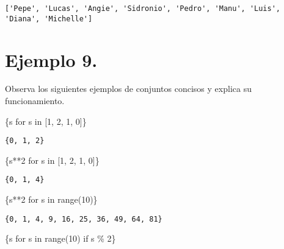 \documentclass[
  letterpaper,
  DIV=11,
  numbers=noendperiod]{scrreprt}
\newenvironment{Shaded}{\begin{snugshade}}{\end{snugshade}}
\newcommand{\BuiltInTok}[1]{\textcolor[rgb]{0.00,0.23,0.31}{#1}}
\newcommand{\ControlFlowTok}[1]{\textcolor[rgb]{0.00,0.23,0.31}{#1}}
\newcommand{\DecValTok}[1]{\textcolor[rgb]{0.68,0.00,0.00}{#1}}
\newcommand{\KeywordTok}[1]{\textcolor[rgb]{0.00,0.23,0.31}{#1}}
\newcommand{\NormalTok}[1]{\textcolor[rgb]{0.00,0.23,0.31}{#1}}
\newcommand{\OperatorTok}[1]{\textcolor[rgb]{0.37,0.37,0.37}{#1}}
\begin{document}
\begin{verbatim}
['Pepe', 'Lucas', 'Angie', 'Sidronio', 'Pedro', 'Manu', 'Luis', 'Diana', 'Michelle']
\end{verbatim}

\section{\texorpdfstring{\textbf{Ejemplo
9.}}{Ejemplo 9.}}\label{ejemplo-9.-1}

Observa los siguientes ejemplos de conjuntos concisos y explica su
funcionamiento.

\begin{Shaded}
\begin{Highlighting}[]
\NormalTok{\{s }\ControlFlowTok{for}\NormalTok{ s }\KeywordTok{in}\NormalTok{ [}\DecValTok{1}\NormalTok{, }\DecValTok{2}\NormalTok{, }\DecValTok{1}\NormalTok{, }\DecValTok{0}\NormalTok{]\}}
\end{Highlighting}
\end{Shaded}

\begin{verbatim}
{0, 1, 2}
\end{verbatim}

\begin{Shaded}
\begin{Highlighting}[]
\NormalTok{\{s}\OperatorTok{**}\DecValTok{2} \ControlFlowTok{for}\NormalTok{ s }\KeywordTok{in}\NormalTok{ [}\DecValTok{1}\NormalTok{, }\DecValTok{2}\NormalTok{, }\DecValTok{1}\NormalTok{, }\DecValTok{0}\NormalTok{]\}}
\end{Highlighting}
\end{Shaded}

\begin{verbatim}
{0, 1, 4}
\end{verbatim}

\begin{Shaded}
\begin{Highlighting}[]
\NormalTok{\{s}\OperatorTok{**}\DecValTok{2} \ControlFlowTok{for}\NormalTok{ s }\KeywordTok{in} \BuiltInTok{range}\NormalTok{(}\DecValTok{10}\NormalTok{)\}}
\end{Highlighting}
\end{Shaded}

\begin{verbatim}
{0, 1, 4, 9, 16, 25, 36, 49, 64, 81}
\end{verbatim}

\begin{Shaded}
\begin{Highlighting}[]
\NormalTok{\{s }\ControlFlowTok{for}\NormalTok{ s }\KeywordTok{in} \BuiltInTok{range}\NormalTok{(}\DecValTok{10}\NormalTok{) }\ControlFlowTok{if}\NormalTok{ s }\OperatorTok{\%} \DecValTok{2}\NormalTok{\}}
\end{Highlighting}
\end{Shaded}
\end{document}
